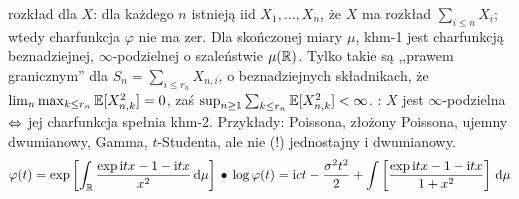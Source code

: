 rozkład dla $X$: dla każdego $n$ istnieją iid $X_1, \ldots, X_n$, że $X$ ma rozkład $\sum_{i \le n} X_i$; wtedy charfunkcja $\varphi$ nie ma zer.
Dla skończonej miary $\mu$, khm-1 jest charfunkcją beznadziejnej, $\infty$-podzielnej o szaleństwie $\mu(\mathbb{R})$.
Tylko takie są ,,prawem granicznym'' dla $S_n = \sum_{i \le r_n} X_{n, i}$, o beznadziejnych składnikach, że $\lim_n \max_{k \le r_n} \mathbb{E} [X_{n,k}^2] = 0$, zaś $\sup_{n \ge 1} \sum_{k \le r_n} \mathbb{E} [X^2_{n,k}] < \infty$.
: $X$ jest $\infty$-podzielna $\Leftrightarrow$ jej charfunkcja spełnia khm-2.
Przykłady: Poissona, złożony Poissona, ujemny dwumianowy, Gamma, $t$-Studenta, ale nie (!) jednostajny i dwumianowy.
\[
	\varphi (t) = \exp \left[\int_{\mathbb{R}} \frac{\exp \textrm{i}tx - 1 - \textrm{i}tx}{x^2} \, \textrm{d}\mu\right] \, \bullet \,
	\log \varphi(t) = \textrm{i} ct - \frac{\sigma^2 t^2}{2} + \int \left[ \frac{\exp \textrm{i}tx-1 -\textrm{i}tx}{1 + x^2} \right] \,\textrm{d} \mu
\]